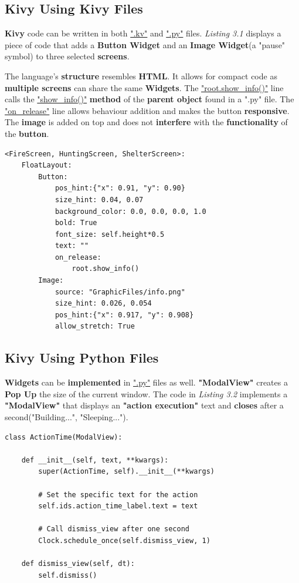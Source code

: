 		\subsection{Kivy Using Kivy Files}
			\par \textbf{Kivy} code can be written in both \underline{".kv"} and \underline{".py"} files. \textit{Listing 3.1} displays a piece of code that adds a \textbf{Button Widget} and an \textbf{Image Widget}(a "pause" symbol) to three selected \textbf{screens}.
			\par The language's \textbf{structure} resembles \textbf{HTML}. It allows for compact code as \textbf{multiple screens} can share the same \textbf{Widgets}. The \underline{"root.show\_info()"} line calls the \underline{"show\_info()"} \textbf{method} of the \textbf{parent object} found in a ".py" file. The \underline{"on\_release"} line allows behaviour addition and makes the button \textbf{responsive}. The \textbf{image} is added on top and does not \textbf{interfere} with the \textbf{functionality} of the \textbf{button}.
			\begin{lstlisting}[caption={\textbf{Kivy} Implementation of the \textbf{Pause Button}},captionpos=b]
<FireScreen, HuntingScreen, ShelterScreen>:
    FloatLayout:
        Button:
            pos_hint:{"x": 0.91, "y": 0.90}
            size_hint: 0.04, 0.07
            background_color: 0.0, 0.0, 0.0, 1.0
            bold: True
            font_size: self.height*0.5
            text: ""
            on_release:
                root.show_info()
        Image:
            source: "GraphicFiles/info.png"
            size_hint: 0.026, 0.054
            pos_hint:{"x": 0.917, "y": 0.908}
            allow_stretch: True
			\end{lstlisting}

		\subsection{Kivy Using Python Files}
		\par \textbf{Widgets} can be \textbf{implemented} in \underline{".py"} files as well. \textbf{"ModalView"} creates a \textbf{Pop Up} the size of the current window. The code in \textit{Listing 3.2} implements a \textbf{"ModalView"} that displays an \textbf{"action execution"} text and \textbf{closes} after a second("Building...", "Sleeping...").
			\begin{lstlisting}[caption={\textbf{Kivy} Implementation of the\textbf{Action Execution Pop Up}},captionpos=b]
class ActionTime(ModalView):

    def __init__(self, text, **kwargs):
        super(ActionTime, self).__init__(**kwargs)

        # Set the specific text for the action
        self.ids.action_time_label.text = text

        # Call dismiss_view after one second
        Clock.schedule_once(self.dismiss_view, 1)

    def dismiss_view(self, dt):
        self.dismiss()
			\end{lstlisting}
	

